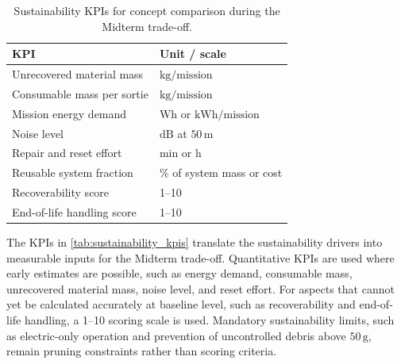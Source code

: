\begin{table}[H]
\centering
\small
\caption{Sustainability KPIs for concept comparison during the Midterm trade-off.}
\label{tab:sustainability_kpis}
\begin{tabularx}{0.85\textwidth}{p{} X}
\toprule
\textbf{KPI} & \textbf{Unit / scale} \\
\midrule

Unrecovered material mass 
& $\mathrm{kg/mission}$ \\

Consumable mass per sortie 
& $\mathrm{kg/mission}$ \\

Mission energy demand 
& $\mathrm{Wh}$ or $\mathrm{kWh/mission}$ \\

Noise level 
& $\mathrm{dB}$ at $50\,\mathrm{m}$ \\

Repair and reset effort 
& min or h \\

Reusable system fraction 
& \% of system mass or cost \\

Recoverability score 
& 1--10 \\

End-of-life handling score 
& 1--10 \\

\bottomrule
\end{tabularx}
\end{table}

The KPIs in \autoref{tab:sustainability_kpis} translate the sustainability drivers into measurable inputs for the Midterm trade-off. Quantitative KPIs are used where early estimates are possible, such as energy demand, consumable mass, unrecovered material mass, noise level, and reset effort. For aspects that cannot yet be calculated accurately at baseline level, such as recoverability and end-of-life handling, a 1--10 scoring scale is used. Mandatory sustainability limits, such as electric-only operation and prevention of uncontrolled debris above $50\,\mathrm{g}$, remain pruning constraints rather than scoring criteria.